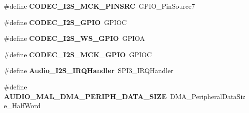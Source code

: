 \begin{DoxyCompactItemize}
\item 
\hypertarget{group___s_t_m32_f4___d_i_s_c_o_v_e_r_y___a_u_d_i_o___c_o_d_e_c___exported___constants_gaaaabc72275fe12f4aaf376b76c56ae7d}{\#define {\bfseries C\-O\-D\-E\-C\-\_\-\-I2\-S\-\_\-\-M\-C\-K\-\_\-\-P\-I\-N\-S\-R\-C}~G\-P\-I\-O\-\_\-\-Pin\-Source7}\label{group___s_t_m32_f4___d_i_s_c_o_v_e_r_y___a_u_d_i_o___c_o_d_e_c___exported___constants_gaaaabc72275fe12f4aaf376b76c56ae7d}

\item 
\hypertarget{group___s_t_m32_f4___d_i_s_c_o_v_e_r_y___a_u_d_i_o___c_o_d_e_c___exported___constants_gaea5167401c4135c9b7ba9d045b4bb13c}{\#define {\bfseries C\-O\-D\-E\-C\-\_\-\-I2\-S\-\_\-\-G\-P\-I\-O}~G\-P\-I\-O\-C}\label{group___s_t_m32_f4___d_i_s_c_o_v_e_r_y___a_u_d_i_o___c_o_d_e_c___exported___constants_gaea5167401c4135c9b7ba9d045b4bb13c}

\item 
\hypertarget{group___s_t_m32_f4___d_i_s_c_o_v_e_r_y___a_u_d_i_o___c_o_d_e_c___exported___constants_gac229109cf6199eeee5ffb2de16114a2d}{\#define {\bfseries C\-O\-D\-E\-C\-\_\-\-I2\-S\-\_\-\-W\-S\-\_\-\-G\-P\-I\-O}~G\-P\-I\-O\-A}\label{group___s_t_m32_f4___d_i_s_c_o_v_e_r_y___a_u_d_i_o___c_o_d_e_c___exported___constants_gac229109cf6199eeee5ffb2de16114a2d}

\item 
\hypertarget{group___s_t_m32_f4___d_i_s_c_o_v_e_r_y___a_u_d_i_o___c_o_d_e_c___exported___constants_ga046d6103f7c6fbca56fe648b3068234f}{\#define {\bfseries C\-O\-D\-E\-C\-\_\-\-I2\-S\-\_\-\-M\-C\-K\-\_\-\-G\-P\-I\-O}~G\-P\-I\-O\-C}\label{group___s_t_m32_f4___d_i_s_c_o_v_e_r_y___a_u_d_i_o___c_o_d_e_c___exported___constants_ga046d6103f7c6fbca56fe648b3068234f}

\item 
\hypertarget{group___s_t_m32_f4___d_i_s_c_o_v_e_r_y___a_u_d_i_o___c_o_d_e_c___exported___constants_ga945c7bd12ce9b76b379608b3b67e2c44}{\#define {\bfseries Audio\-\_\-\-I2\-S\-\_\-\-I\-R\-Q\-Handler}~S\-P\-I3\-\_\-\-I\-R\-Q\-Handler}\label{group___s_t_m32_f4___d_i_s_c_o_v_e_r_y___a_u_d_i_o___c_o_d_e_c___exported___constants_ga945c7bd12ce9b76b379608b3b67e2c44}

\item 
\hypertarget{group___s_t_m32_f4___d_i_s_c_o_v_e_r_y___a_u_d_i_o___c_o_d_e_c___exported___constants_ga54ab1277aa45180f230afbf31f69ddbb}{\#define {\bfseries A\-U\-D\-I\-O\-\_\-\-M\-A\-L\-\_\-\-D\-M\-A\-\_\-\-P\-E\-R\-I\-P\-H\-\_\-\-D\-A\-T\-A\-\_\-\-S\-I\-Z\-E}~D\-M\-A\-\_\-\-Peripheral\-Data\-Size\-\_\-\-Half\-Word}\label{group___s_t_m32_f4___d_i_s_c_o_v_e_r_y___a_u_d_i_o___c_o_d_e_c___exported___constants_ga54ab1277aa45180f230afbf31f69ddbb}


\end{DoxyCompactItemize}
